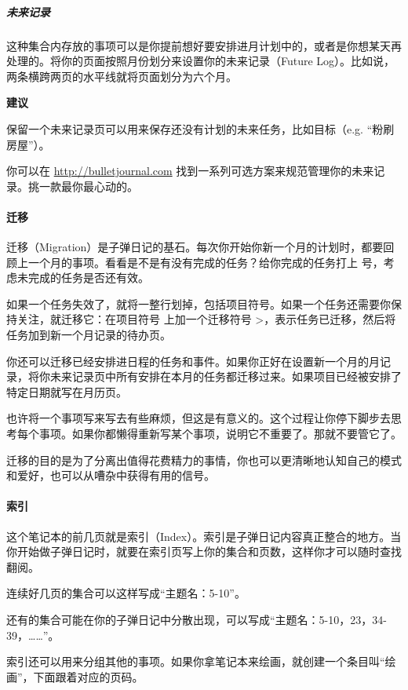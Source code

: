 \documentclass[a5paper]{article}
\begin{document}
\subparagraph{未来记录}

这种集合内存放的事项可以是你提前想好要安排进月计划中的，或者是你想某天再处理的。将你的页面按照月份划分来设置你的未来记录（Future Log）。比如说，两条横跨两页的水平线就将页面划分为六个月。

\textbf{建议}

保留一个未来记录页可以用来保存还没有计划的未来任务，比如目标（e.g. “粉刷房屋”）。

你可以在 \href{http://bulletjournal.com}{http://bulletjournal.com} 找到一系列可选方案来规范管理你的未来记录。挑一款最你最心动的。

\clearpage

\paragraph{迁移}

迁移（Migration）是子弹日记的基石。每次你开始你新一个月的计划时，都要回顾上一个月的事项。看看是不是有没有完成的任务？给你完成的任务打上 \texttimes 号，考虑未完成的任务是否还有效。

如果一个任务失效了，就将一整行划掉，包括项目符号。如果一个任务还需要你保持关注，就迁移它：在项目符号 \textbullet 上加一个迁移符号 \textgreater，表示任务已迁移，然后将任务加到新一个月记录的待办页。

你还可以迁移已经安排进日程的任务和事件。如果你正好在设置新一个月的月记录，将你未来记录页中所有安排在本月的任务都迁移过来。如果项目已经被安排了特定日期就写在月历页。

也许将一个事项写来写去有些麻烦，但这是有意义的。这个过程让你停下脚步去思考每个事项。如果你都懒得重新写某个事项，说明它不重要了。那就不要管它了。

迁移的目的是为了分离出值得花费精力的事情，你也可以更清晰地认知自己的模式和爱好，也可以从嘈杂中获得有用的信号。

\clearpage

\paragraph{索引}

这个笔记本的前几页就是索引（Index）。索引是子弹日记内容真正整合的地方。当你开始做子弹日记时，就要在索引页写上你的集合和页数，这样你才可以随时查找翻阅。

连续好几页的集合可以这样写成“主题名：5-10”。

还有的集合可能在你的子弹日记中分散出现，可以写成“主题名：5-10，23，34-39，……”。

索引还可以用来分组其他的事项。如果你拿笔记本来绘画，就创建一个条目叫“绘画”，下面跟着对应的页码。
\end{document}
